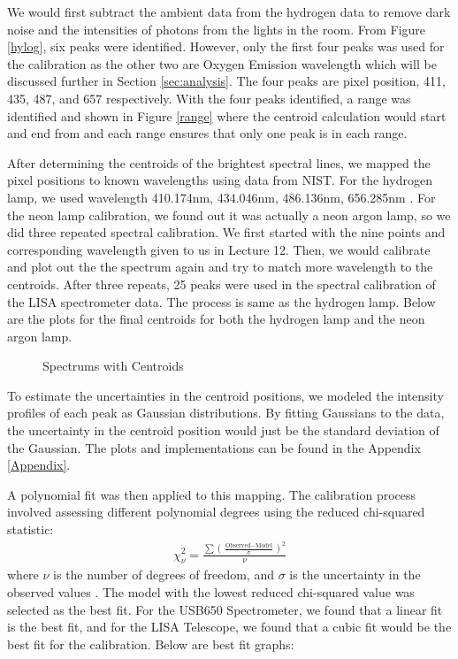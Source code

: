 \documentclass[10pt, preprint]{aastex}
\begin{document}
We would first subtract the ambient data from the hydrogen data to remove dark noise and the intensities of photons from the lights in the room. From Figure \ref{hylog}, six peaks were identified. However, only the first four peaks was used for the calibration as the other two are Oxygen Emission wavelength which will be discussed further in Section \ref{sec:analysis}. The four peaks are pixel position, 411, 435, 487, and 657 respectively. With the four peaks identified, a range was identified and shown in Figure \ref{range} where the centroid calculation would start and end from and each range ensures that only one peak is in each range.

After determining the centroids of the brightest spectral lines, we mapped the pixel positions to known wavelengths using data from NIST. For the hydrogen lamp, we used wavelength  410.174nm, 434.046nm, 486.136nm, 656.285nm \cite{hydrogentable}. For the neon lamp calibration, we found out it was actually a neon argon lamp, so we did three repeated spectral calibration\cite{ast325lecture12}. We first started with the nine points and corresponding wavelength given to us in Lecture 12. Then, we would calibrate and plot out the the spectrum again and try to match more wavelength to the centroids. After three repeats, 25 peaks were used in the spectral calibration of the LISA spectrometer data. The process is same as the hydrogen lamp. Below are the plots for the final centroids for both the hydrogen lamp and the neon argon lamp.

\begin{figure}[H]
  \centering
  \hfill
  \caption{\label{fig:h} Spectrums with Centroids}
\end{figure}

To estimate the uncertainties in the centroid positions, we modeled the intensity profiles of each peak as Gaussian distributions. By fitting Gaussians to the data, the uncertainty in the centroid position would just be the standard deviation of the Gaussian. The plots and implementations can be found in the Appendix \ref{Appendix}.

A polynomial fit was then applied to this mapping. The calibration process involved assessing different polynomial degrees using the reduced chi-squared statistic:
\begin{align}
    \chi^2_{\nu} = \frac{\sum \left( \frac{\text{Observed} - \text{Model}}{\sigma} \right)^2}{\nu}
\end{align}
where \( \nu \) is the number of degrees of freedom, and \( \sigma \) is the uncertainty in the observed values \cite{ast325lecture11}. The model with the lowest reduced chi-squared value was selected as the best fit. For the USB650 Spectrometer, we found that a linear fit is the best fit, and for the LISA Telescope, we found that a cubic fit would be the best fit for the calibration. Below are best fit graphs:
\end{document}
